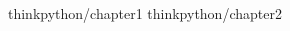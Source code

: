 \documentclass[a4paper,11pt]{book}
\begin{document}
\begin{CJK}{UTF8}{song}

\CJKtilde
\CJKindent
 {thinkpython/chapter1}
 {thinkpython/chapter2}

\newpage
\end{CJK}
\end{document}
